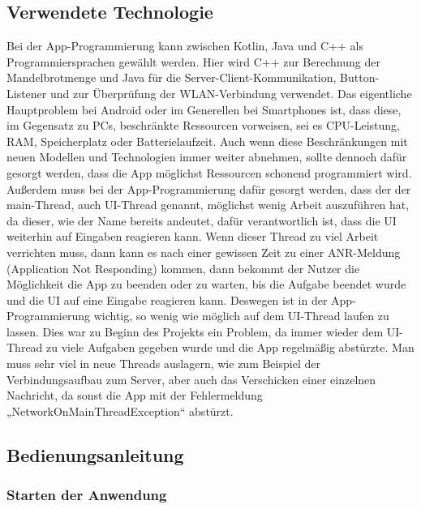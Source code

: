 \documentclass[12pt, onecolumn,notitlepage]{scrartcl}
\begin{document}
\subsection{Verwendete Technologie}
Bei der App-Programmierung kann zwischen Kotlin, Java und C++ als Programmiersprachen gewählt werden. Hier wird C++ zur Berechnung der Mandelbrotmenge und Java für die Server-Client-Kommunikation, Button-Listener und zur Überprüfung der WLAN-Verbindung verwendet. Das eigentliche Hauptproblem bei Android oder im Generellen bei Smartphones ist, dass diese, im Gegensatz zu PCs, beschränkte Ressourcen vorweisen, sei es CPU-Leistung, RAM, Speicherplatz oder Batterielaufzeit. Auch wenn diese Beschränkungen mit neuen Modellen und Technologien immer weiter abnehmen, sollte dennoch dafür gesorgt werden, dass die App möglichst Ressourcen schonend programmiert wird. Außerdem muss bei der App-Programmierung dafür gesorgt werden, dass der der main-Thread, auch UI-Thread genannt, möglichst wenig Arbeit auszuführen hat, da dieser, wie der Name bereits andeutet, dafür verantwortlich ist, dass die UI weiterhin auf Eingaben reagieren kann. Wenn dieser Thread zu viel Arbeit verrichten muss, dann kann es nach einer gewissen Zeit zu einer ANR-Meldung (Application Not Responding) kommen, dann bekommt der Nutzer die Möglichkeit die App zu beenden oder zu warten, bis die Aufgabe beendet wurde und die UI auf eine Eingabe reagieren kann. Deswegen ist in der App-Programmierung wichtig, so wenig wie möglich auf dem UI-Thread laufen zu lassen. Dies war zu Beginn des Projekts ein Problem, da immer wieder dem UI-Thread zu viele Aufgaben gegeben wurde und die App regelmäßig abstürzte. Man muss sehr viel in neue Threads auslagern, wie zum Beispiel der Verbindungsaufbau zum Server, aber auch das Verschicken einer einzelnen Nachricht, da sonst die App mit der Fehlermeldung „NetworkOnMainThreadException“ abstürzt.
\subsection{Bedienungsanleitung}
\subsubsection{Starten der Anwendung}
\end{document}
